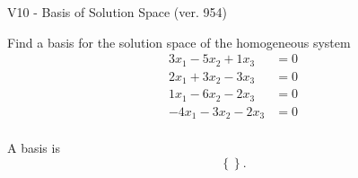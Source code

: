 \begin{exercise}
  \begin{exerciseTitle}V10 - Basis of Solution Space (ver. 954)\end{exerciseTitle}
  \begin{exerciseStatement}
    Find a basis for the solution space of the homogeneous system 
\begin{align*}
 3 x_ 1 -5 x_ 2 + 1 x_ 3 &= 0  \\ 
  2 x_ 1 + 3 x_ 2 -3 x_ 3 &= 0  \\ 
  1 x_ 1 -6 x_ 2 -2 x_ 3 &= 0  \\ 
  -4 x_ 1 -3 x_ 2 -2 x_ 3 &= 0  \\ 
 \end{align*}


 
  \end{exerciseStatement}

  \begin{exerciseAnswer}
   A basis is   
\[\left\{\right\}.\]

  


  \end{exerciseAnswer}
\end{exercise}